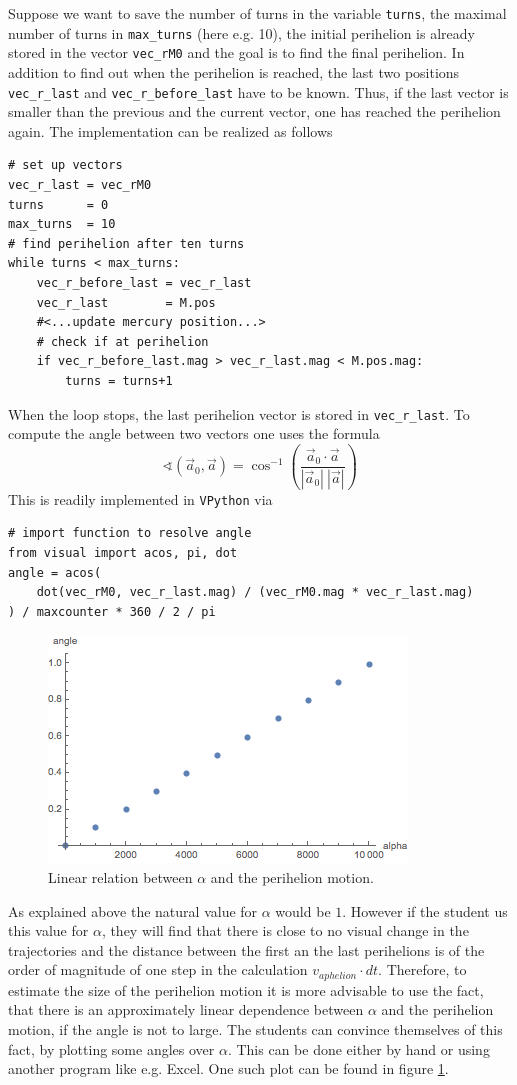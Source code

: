 \documentclass[12pt]{iopart}
\begin{document}
Suppose we want to save the number of turns in the variable \texttt{turns}, the maximal number of turns in \texttt{max\_turns} (here e.g. 10), the initial perihelion is already stored in the vector \texttt{vec\_rM0} and the goal is to find the final perihelion.
In addition to find out when the perihelion is reached, the last two positions \texttt{vec\_r\_last} and \texttt{vec\_r\_before\_last} have to be known.
Thus, if the last vector is smaller than the previous and the current vector, one has reached the perihelion again.
The implementation can be realized as follows
\begin{lstlisting}
# set up vectors
vec_r_last = vec_rM0
turns      = 0
max_turns  = 10
# find perihelion after ten turns
while turns < max_turns:
	vec_r_before_last = vec_r_last
	vec_r_last        = M.pos
	#<...update mercury position...>
	# check if at perihelion
	if vec_r_before_last.mag > vec_r_last.mag < M.pos.mag:
		turns = turns+1
\end{lstlisting}
When the loop stops, the last perihelion vector is stored in  \texttt{vec\_r\_last}.
To compute the angle between two vectors one uses the formula
 \begin{equation}
 	\sphericalangle(\vec{a}_0,\vec{a}) = \cos^{-1} \left( \frac{\vec{a}_0 \cdot \vec{a}}{|\vec{a}_0|\:|\vec{a}|} \right)
 \end{equation}
This is readily implemented in \texttt{VPython} via
\begin{lstlisting}
# import function to resolve angle
from visual import acos, pi, dot
angle = acos(
	dot(vec_rM0, vec_r_last.mag) / (vec_rM0.mag * vec_r_last.mag)
) / maxcounter * 360 / 2 / pi
\end{lstlisting}

\begin{figure}[htb]
	\centering
	\includegraphics[width=.5\textwidth]{figs/AlphaAngle.png}
	\caption{\label{fig:AlphaAngle} Linear relation between $\alpha$ and the perihelion motion.}
\end{figure}

As explained above the natural value for $\alpha$ would be $1$.
However if the student us this value for $\alpha$, they will find that there is close to no visual change in the trajectories and the distance between the first an the last perihelions is of the order of magnitude of one step in the calculation $v_{aphelion}\cdot dt$.
Therefore, to estimate the size of the perihelion motion it is more advisable to use the fact, that there is an approximately linear dependence between $\alpha$ and the perihelion motion, if the angle is not to large.
The students can convince themselves of this fact, by plotting some angles over $\alpha$.
This can be done either by hand or using another program like e.g. Excel.
One such plot can be found in figure \ref{fig:AlphaAngle}.
\end{document}
